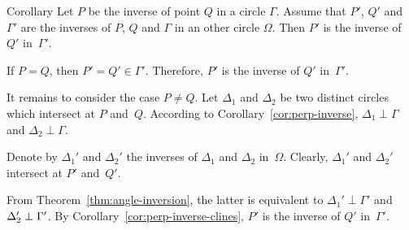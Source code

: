 
\begin{thm}{Corollary}\label{cor:invese-comp}
Let $P$ be the inverse of point $Q$ in a circle $\Gamma$.
Assume that $P'$, $Q'$ and $\Gamma'$ 
are the inverses of  $P$, $Q$ and $\Gamma$ in an other circle $\Omega$.
Then $P'$ is the inverse  of $Q'$ in~$\Gamma'$.
\end{thm}


If $P=Q$, then $P'=Q'\in\Gamma'$. 
Therefore, $P'$ is the inverse of $Q'$ in~$\Gamma'$.

It remains to consider the case $P\ne Q$. 
Let $\Delta_1$ and $\Delta_2$ be two distinct circles which intersect at $P$ and~$Q$.
According to Corollary~\ref{cor:perp-inverse}, 
$\Delta_1\perp\Gamma$ and $\Delta_2\perp\Gamma$.

Denote by $\Delta_1'$ and $\Delta_2'$ the inverses of $\Delta_1$ and $\Delta_2$ in~$\Omega$.
Clearly, $\Delta_1'$ and $\Delta_2'$ intersect at $P'$ and~$Q'$.

From Theorem~\ref{thm:angle-inversion}, 
the latter is equivalent 
to $\Delta_1'\perp\Gamma'$ and $\Delta_2'\z\perp\Gamma'$.
By Corollary~\ref{cor:perp-inverse-clines}, $P'$ is the inverse of $Q'$ in~$\Gamma'$.
\qeds

